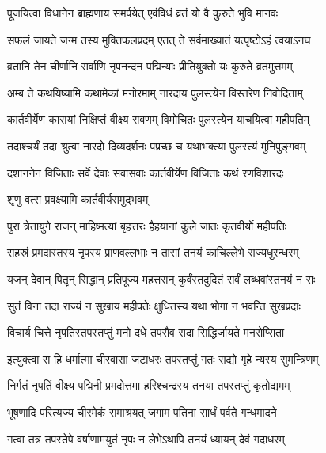 \twolineshloka
{पूजयित्वा विधानेन ब्राह्मणाय समर्पयेत्}
{एवंविधं व्रतं यो वै कुरुते भुवि मानवः} %

\twolineshloka
{सफलं जायते जन्म तस्य मुक्तिफलप्रदम्}
{एतत् ते सर्वमाख्यातं यत्पृष्टोऽहं त्वयाऽनघ} %

\twolineshloka
{व्रतानि तेन चीर्णानि सर्वाणि नृपनन्दन}
{पद्मिन्याः प्रीतियुक्तो यः कुरुते व्रतमुत्तमम्} %

\twolineshloka
{अम्ब ते कथयिष्यामि कथामेकां मनोरमाम्}
{नारदाय पुलस्त्येन विस्तरेण निवोदिताम्} %

\twolineshloka
{कार्तवीर्येण कारायां निक्षिप्तं वीक्ष्य रावणम्}
{विमोचितः पुलस्त्येन याचयित्वा महीपतिम्} %

\twolineshloka
{तदाश्चर्यं तदा श्रुत्वा नारदो दिव्यदर्शनः}
{पप्रच्छ च यथाभक्त्या पुलस्त्यं मुनिपुङ्गवम्} %


\twolineshloka
{दशाननेन विजिताः सर्वे देवाः सवासवाः}
{कार्तवीर्येण विजिताः कथं रणविशारदः} %



\onelineshloka
{शृणु वत्स प्रवक्ष्यामि कार्तवीर्यसमुद्भवम्} %

\twolineshloka
{पुरा त्रेतायुगे राजन् माहिष्मत्यां बृहत्तरः}
{हैहयानां कुले जातः कृतवीर्यो महीपतिः} %

\twolineshloka
{सहस्रं प्रमदास्तस्य नृपस्य प्राणवल्लभाः}
{न तासां तनयं काचिल्लेभे राज्यधुरन्धरम्} %

\twolineshloka
{यजन् देवान् पितॄन् सिद्धान् प्रतिपूज्य महत्तरान्}
{कुर्वंस्तदुदितं सर्वं लब्धवांस्तनयं न सः} %

\twolineshloka
{सुतं विना तदा राज्यं न सुखाय महीपतेः}
{क्षुधितस्य यथा भोगा न भवन्ति सुखप्रदाः} %

\twolineshloka
{विचार्य चित्ते नृपतिस्तपस्तप्तुं मनो दधे}
{तपसैव सदा सिद्धिर्जायते मनसेप्सिता} %

\twolineshloka
{इत्युक्त्वा स हि धर्मात्मा चीरवासा जटाधरः}
{तपस्तप्तुं गतः सद्यो गृहे न्यस्य सुमन्त्रिणम्} %

\twolineshloka
{निर्गतं नृपतिं वीक्ष्य पद्मिनी प्रमदोत्तमा}
{हरिश्चन्द्रस्य तनया तपस्तप्तुं कृतोद्यमम्} %

\twolineshloka
{भूषणादि परित्यज्य चीरमेकं समाश्रयत्}
{जगाम पतिना सार्धं पर्वते गन्धमादने} %

\twolineshloka
{गत्वा तत्र तपस्तेपे वर्षाणामयुतं नृपः}
{न लेभेऽथापि तनयं ध्यायन् देवं गदाधरम्} %

